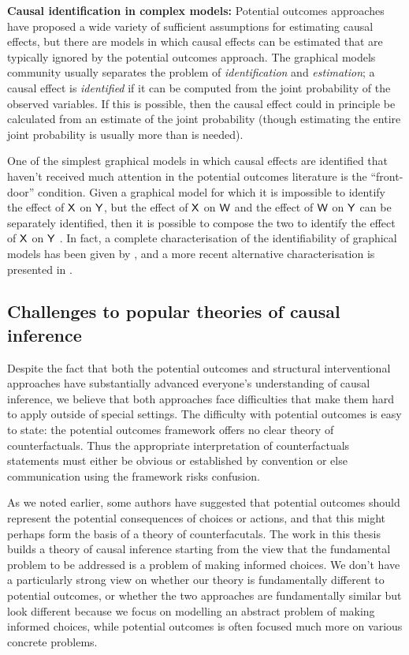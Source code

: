 \textbf{Causal identification in complex models:} Potential outcomes approaches have proposed a wide variety of sufficient assumptions for estimating causal effects, but there are models in which causal effects can be estimated that are typically ignored by the potential outcomes approach. The graphical models community usually separates the problem of \emph{identification} and \emph{estimation}; a causal effect is \emph{identified} if it can be computed from the joint probability of the observed variables. If this is possible, then the causal effect could in principle be calculated from an estimate of the joint probability (though estimating the entire joint probability is usually more than is needed). 

One of the simplest graphical models in which causal effects are identified that haven't received much attention in the potential outcomes literature is the ``front-door'' condition. Given a graphical model for which it is impossible to identify the effect of $\mathsf{X}$ on $\mathsf{Y}$, but the effect of $\mathsf{X}$ on $\mathsf{W}$ and the effect of $\mathsf{W}$ on $\mathsf{Y}$ can be separately identified, then it is possible to compose the two to identify the effect of $\mathsf{X}$ on $\mathsf{Y}$ \citep[Section 3.3.2]{pearl_causality:_2009}. In fact, a complete characterisation of the identifiability of graphical models has been given by \citet{shpitser_complete_2008}, and a more recent alternative characterisation is presented in \citet{richardson_nested_2017}.   

\subsection{Challenges to popular theories of causal inference}

Despite the fact that both the potential outcomes and structural interventional approaches have substantially advanced everyone's understanding of causal inference, we believe that both approaches face difficulties that make them hard to apply outside of special settings. The difficulty with potential outcomes is easy to state: the potential outcomes framework offers no clear theory of counterfactuals. Thus the appropriate interpretation of counterfactuals statements must either be obvious or established by convention or else communication using the framework risks confusion. 

As we noted earlier, some authors have suggested that potential outcomes should represent the potential consequences of choices or actions, and that this might perhaps form the basis of a theory of counterfacutals. The work in this thesis builds a theory of causal inference starting from the view that the fundamental problem to be addressed is a problem of making informed choices. We don't have a particularly strong view on whether our theory is fundamentally different to potential outcomes, or whether the two approaches are fundamentally similar but look different because we focus on modelling an abstract problem of making informed choices, while potential outcomes is often focused much more on various concrete problems.

